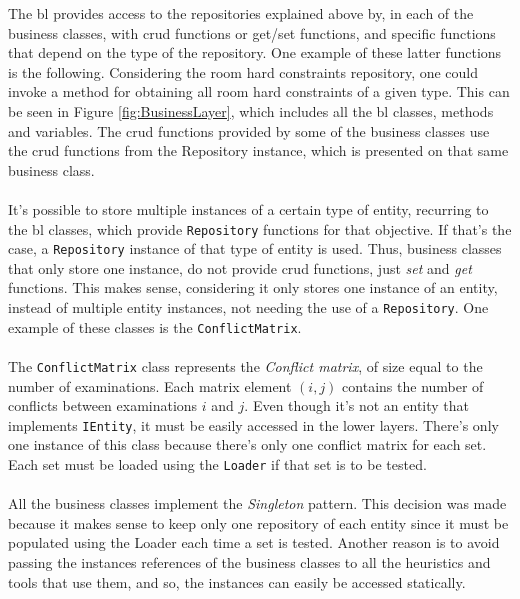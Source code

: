 The \gls{bl} provides access to the repositories explained above by, in each of the business classes, with \gls{crud} functions or get/set functions, and specific functions that depend on the type of the repository. One example of these latter functions is the following. Considering the room hard constraints repository, one could invoke a method for obtaining all room hard constraints of a given type. This can be seen in Figure \ref{fig:BusinessLayer}, which includes all the \gls{bl} classes, methods and variables. The \gls{crud} functions provided by some of the business classes use the \gls{crud} functions from the Repository instance, which is presented on that same business class.\\
\\
It's possible to store multiple instances of a certain type of entity, recurring to the \gls{bl} classes, which provide \verb+Repository+ functions for that objective. If that's the case, a \verb+Repository+ instance of that type of entity is used. Thus, business classes that only store one instance, do not provide \gls{crud} functions, just \textit{set} and \textit{get} functions. This makes sense, considering it only stores one instance of an entity, instead of multiple entity instances, not needing the use of a \verb+Repository+. One example of these classes is the \verb+ConflictMatrix+. \\
\\
The \verb+ConflictMatrix+ class represents the \textit{Conflict matrix}, of size equal to the number of examinations. Each matrix element $(i,j)$ contains the number of conflicts between examinations $i$ and $j$. Even though it's not an entity that implements \verb+IEntity+, it must be easily accessed in the lower layers. There's only one instance of this class because there's only one conflict matrix for each set. Each set must be loaded using the \verb+Loader+ if that set is to be tested.\\
\\
All the business classes implement the \textit{Singleton} pattern. This decision was made because it makes sense to keep only one repository of each entity since it must be populated using the Loader each time a set is tested. Another reason is to avoid passing the instances references of the business classes to all the heuristics and tools that use them, and so, the instances can easily be accessed statically.\\

